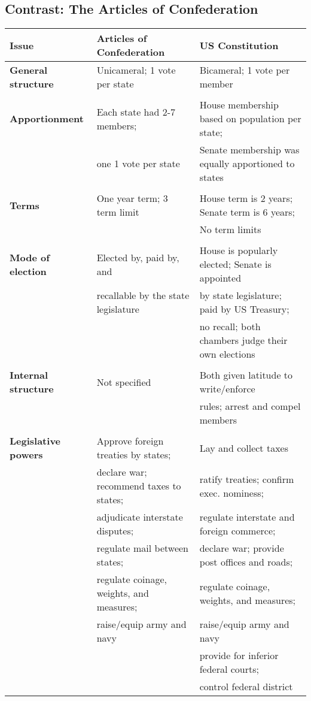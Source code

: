 \documentclass[10pt]{article}
\begin{document}
\begin{sidewaystable}[h]
\section{Contrast: The Articles of Confederation}
    \centering
\begin{tabular}{lll}
    Issue           &       Articles of Confederation       &       US Constitution             \\
    \midrule
    \textbf{General structure} &     Unicameral; 1 vote per state    &       Bicameral; 1 vote per member \\
    \\
    \textbf{Apportionment} & Each state had 2-7 members;  & House membership based on population per state;  \\
     & one 1 vote per state & Senate membership was equally apportioned to states \\ \\
     \textbf{Terms} & One year term; 3 term limit & House term is 2 years; Senate term is 6 years; \\
     & & No term limits\\ \\
     \textbf{Mode of election} & Elected by, paid by, and & House is popularly elected; Senate is appointed \\
     & recallable by the state legislature & by state legislature; paid by US Treasury; \\
     & & no recall; both chambers judge their own elections \\ \\
     \textbf{Internal structure} & Not specified & Both given latitude to write/enforce \\
     && rules; arrest and compel members\\ \\
     \textbf{Legislative powers} & Approve foreign treaties by states; & Lay and collect taxes \\
     & declare war; recommend taxes to states; & ratify treaties; confirm exec. nominess;\\
     & adjudicate interstate disputes; & regulate interstate and foreign commerce;\\
     & regulate mail between states; & declare war; provide post offices and roads;\\
     & regulate coinage, weights, and measures; & regulate coinage, weights, and measures;\\
     & raise/equip army and navy & raise/equip army and navy\\
     && provide for inferior federal courts;\\
     &&control federal district \\ \bottomrule
\end{tabular}
\end{sidewaystable}
\end{document}
